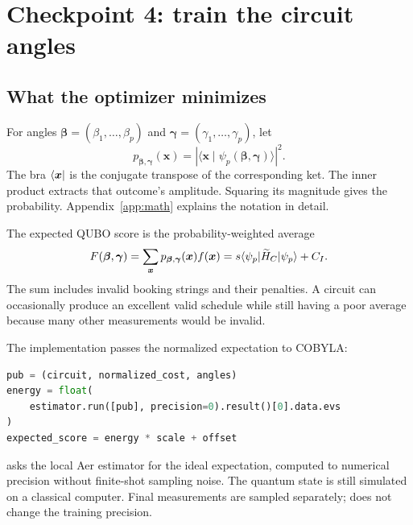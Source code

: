 \section{Checkpoint 4: train the circuit angles}\label{sec:training}
\subsection{What the optimizer minimizes}
For angles $\boldsymbol\beta=(\beta_1,\ldots,\beta_p)$ and
$\boldsymbol\gamma=(\gamma_1,\ldots,\gamma_p)$, let
\begin{equation}
p_{\boldsymbol\beta,\boldsymbol\gamma}(\boldsymbol{x})
=\left|\langle\boldsymbol{x}\mid
\psi_p(\boldsymbol\beta,\boldsymbol\gamma)\rangle\right|^2.
\end{equation}
The bra $\langle \boldsymbol{x}\rvert$ is the conjugate transpose of the corresponding
ket. The inner product extracts that outcome's amplitude. Squaring its magnitude
gives the probability. Appendix~\ref{app:math} explains the notation in detail.

The expected QUBO score is the probability-weighted average
\begin{equation}\label{eq:expected-cost}
F(\boldsymbol\beta,\boldsymbol\gamma)
=\sum_{\boldsymbol{x}}p_{\boldsymbol\beta,\boldsymbol\gamma}(\boldsymbol{x})
f(\boldsymbol{x})
=s\langle \psi_p\rvert\widetilde H_C\lvert \psi_p\rangle+C_I.
\end{equation}
The sum includes invalid booking strings and their penalties. A circuit can
occasionally produce an excellent valid schedule while still having a poor
average because many other measurements would be invalid.

The implementation passes the normalized expectation to COBYLA:
\begin{lstlisting}[language=Python]
pub = (circuit, normalized_cost, angles)
energy = float(
    estimator.run([pub], precision=0).result()[0].data.evs
)
expected_score = energy * scale + offset
\end{lstlisting}
 asks the local Aer estimator for the ideal expectation,
computed to numerical precision without finite-shot sampling noise\cite{aer}.
The quantum state is still simulated on a classical computer. Final measurements
are sampled separately;  does not change the training precision.

